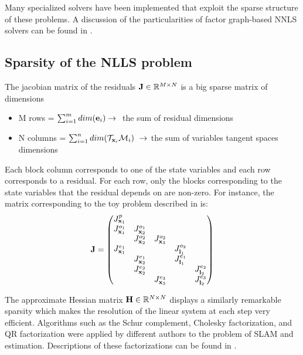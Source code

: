 Many specialized solvers \cite{grisetti2011g2o, kaess2012isam2, ila2017slam++} have been implemented that exploit the sparse structure of these 
problems. A discussion of the particularities of factor graph-based NNLS solvers can be found in \cite{dellaert2017factor, sola2017course}.




\subsection{Sparsity of the NLLS problem}

The jacobian matrix of the residuals ${\bf J} \in \mathbb{R}^{M \times N}$ is a big sparse matrix of dimensions 
\begin{itemize}
    \item M rows = $\sum_{i=1}^{m}dim({\bf e}_i) \rightarrow~$ the sum of residual dimensions
    \item N columns = $\sum_{i=1}^{n}dim(\mathcal{T}_{{\bf x}_i}\mathcal{M}_i)~\rightarrow$ the sum of variables tangent spaces dimensions 
\end{itemize}   

Each block column corresponds to one of the state variables and each row corresponds to a residual. For each row, only the blocks corresponding to the
state variables that the residual depends on are non-zero. For instance, the matrix corresponding to the toy problem described in  is:
\begin{equation}
    {\bf J}=
    \begin{pmatrix}
        J^{p}_{{\bf x}_1} &   &     &     &     \\
       J^{o_1}_{{\bf x}_1} & J^{o_1}_{{\bf x}_2}  &     &     &     \\
                       & J^{o_2}_{{\bf x}_2}  & J^{o_2}_{{\bf x}_3}   &     &     \\
       J^{e_1}_{{\bf x}_1} &                  &     &  J^{o_2}_{{\bf l}_1}   &     \\
                       & J^{e_1}_{{\bf x}_2}  &     &  J^{e_1}_{{\bf l}_1}   &     \\
                       & J^{e_2}_{{\bf x}_2}  &     &     &  J^{e_2}_{{\bf l}_2}   \\
                       &                  & J^{e_3}_{{\bf x}_3}    &     &  J^{e_3}_{{\bf l}_2}   \\
    \end{pmatrix}
    \label{eq:sparse_jac}
\end{equation}



The approximate Hessian matrix ${\bf H} \in \mathbb{R}^{N \times N}$ displays a similarly remarkable sparsity which makes the resolution of the linear system
at each step very efficient. Algorithms such as the Schur complement, Cholesky factorization, and QR factorization were applied by different authors to the 
problem of SLAM and estimation. Descriptions of these factorizations can be found in \cite{sola2017course, dellaert2017factor}.







